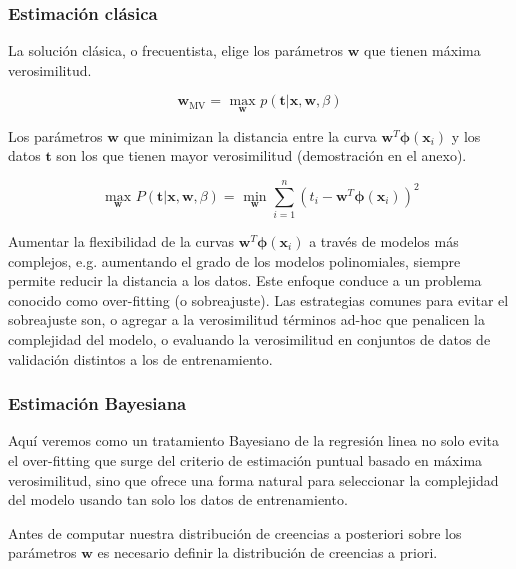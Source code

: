 \documentclass[a4paper,10pt]{article}
\begin{document}
\subsubsection{Estimaci\'on cl\'asica}

La soluci\'on cl\'asica, o frecuentista, elige los par\'ametros $\bm{w}$ que tienen máxima verosimilitud.

\begin{equation}
 \bm{w}_\text{MV} = \underset{\bm{w}}{\text{ max }} p(\bm{t} | \bm{x}, \bm{w}, \beta)
\end{equation}

Los par\'ametros $\bm{w}$ que minimizan la distancia entre la curva $\bm{w}^T\bm{\phi}(\bm{x}_i)$ y los datos $\bm{t}$ son los que tienen mayor verosimilitud (demostraci\'on en el anexo).

\begin{equation}
 \underset{\bm{w}}{\text{ max }} P(\bm{t} | \bm{x}, \bm{w}, \beta) = \underset{\bm{w}}{\text{ min }} \sum_{i=1}^{n}  (t_i - \bm{w}^T\bm{\phi}(\bm{x}_i))^2 
\end{equation}

Aumentar la flexibilidad de la curvas $\bm{w}^T\bm{\phi}(\bm{x}_i)$ a trav\'es de modelos m\'as complejos, e.g. aumentando el grado de los modelos polinomiales, siempre permite reducir la distancia a los datos.
Este enfoque conduce a un problema conocido como over-fitting (o sobreajuste).
Las estrategias comunes para evitar el sobreajuste son, o agregar a la verosimilitud t\'erminos ad-hoc que penalicen la complejidad del modelo, o evaluando la verosimilitud en conjuntos de datos de validaci\'on distintos a los de entrenamiento.

\subsubsection{Estimaci\'on Bayesiana}

Aqu\'i veremos como un tratamiento Bayesiano de la regresi\'on linea no solo evita el over-fitting que surge del criterio de estimaci\'on puntual basado en m\'axima verosimilitud, sino que ofrece una forma natural para seleccionar la complejidad del modelo usando tan solo los datos de entrenamiento.

\vspace{0.3cm}

Antes de computar nuestra distribuci\'on de creencias a posteriori sobre los par\'ametros $\bm{w}$ es necesario definir la distribuci\'on de creencias a priori.
\end{document}

